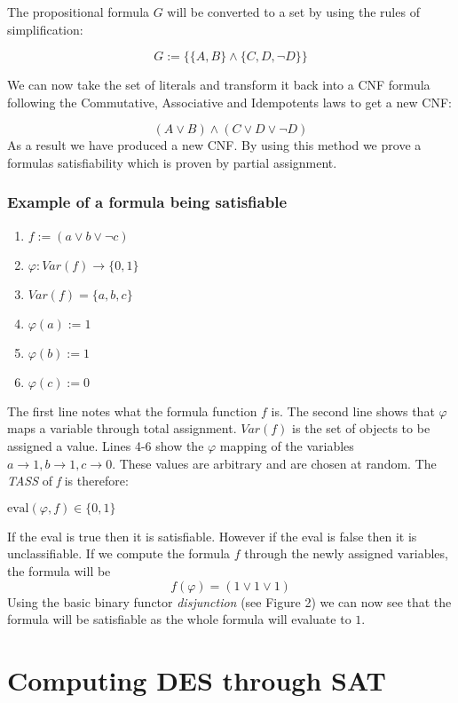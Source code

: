 \documentclass[11pt,a4paper]{report}
\begin{document}
The propositional formula $G$ will be converted to a set by using the rules of simplification:

\begin{displaymath}
 G := \{\{{{A,B}\} \land \{{C,D,\neg D}}\}\}
\end{displaymath}

We can now take the set of literals and transform it back into a CNF formula following the Commutative, Associative and Idempotents laws to get a new CNF:

\begin{displaymath}
(A \lor B) \land (C \lor D \lor \neg D)
\end{displaymath}
As a result we have produced a new CNF. By using this method we prove a formulas satisfiability which is proven by partial assignment. 


\subsection{Example of a formula being satisfiable}

\begin{enumerate}
\item $f:= (a \lor b \lor \neg c)$
\item $\varphi: Var (f) \rightarrow \{0,1\}$
\item $Var (f) = \{a,b,c\}$
\item $\varphi(a):= 1$
\item $\varphi(b):= 1$
\item $\varphi(c):= 0$
\end{enumerate}

The first line notes what the formula function $f$ is. The second line shows that $\varphi$ maps a variable through total assignment. $Var(f)$ is the set of objects to be assigned a value. Lines 4-6 show the $\varphi$ mapping of the variables $a \rightarrow 1, b \rightarrow 1, c \rightarrow 0$. These values are arbitrary and are chosen at random. 
The \textit{TASS} of \textit{f} is therefore: 

\begin{center}
$\text{eval} (\varphi, f) \in \{0,1\}$
\end{center}
If the eval is true then it is satisfiable. However if the eval is false then it is unclassifiable. 
If we compute the formula $f$ through the newly assigned variables, the formula will be
\begin{displaymath}
f(\varphi) = (1 \lor 1 \lor 1)
\end{displaymath}
Using the basic binary functor \emph{disjunction} (see Figure 2) we can now see that the formula will be satisfiable as the whole formula will evaluate to $1$. 

\chapter{Computing DES through SAT}
\label{cha:dessat}




\end{document}

